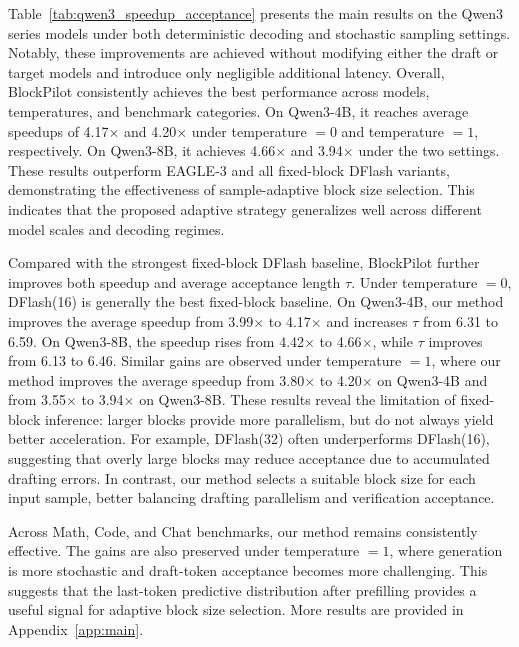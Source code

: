 \documentclass{llmxive}
\begin{document}


Table~\ref{tab:qwen3_speedup_acceptance} presents the main results on the Qwen3 series models under both deterministic decoding and stochastic sampling settings. Notably, these improvements are achieved without modifying either the draft or target models and introduce only negligible additional latency.  Overall, BlockPilot consistently achieves the best performance across models, temperatures, and benchmark categories. On Qwen3-4B, it reaches average speedups of 4.17$\times$ and 4.20$\times$ under temperature $=0$ and temperature $=1$, respectively. On Qwen3-8B, it achieves 4.66$\times$ and 3.94$\times$ under the two settings. These results outperform EAGLE-3 and all fixed-block DFlash variants, demonstrating the effectiveness of sample-adaptive block size selection. This indicates that the proposed adaptive strategy generalizes well across different model scales and decoding regimes.

Compared with the strongest fixed-block DFlash baseline, BlockPilot further improves both speedup and average acceptance length $\tau$. Under temperature $=0$, DFlash(16) is generally the best fixed-block baseline. On Qwen3-4B, our method improves the average speedup from 3.99$\times$ to 4.17$\times$ and increases $\tau$ from 6.31 to 6.59. On Qwen3-8B, the speedup rises from 4.42$\times$ to 4.66$\times$, while $\tau$ improves from 6.13 to 6.46. Similar gains are observed under temperature $=1$, where our method improves the average speedup from 3.80$\times$ to 4.20$\times$ on Qwen3-4B and from 3.55$\times$ to 3.94$\times$ on Qwen3-8B. These results reveal the limitation of fixed-block inference: larger blocks provide more parallelism, but do not always yield better acceleration. For example, DFlash(32) often underperforms DFlash(16), suggesting that overly large blocks may reduce acceptance due to accumulated drafting errors. In contrast, our method selects a suitable block size for each input sample, better balancing drafting parallelism and verification acceptance.

Across Math, Code, and Chat benchmarks, our method remains consistently effective. The gains are also preserved under temperature $=1$, where generation is more stochastic and draft-token acceptance becomes more challenging. This suggests that the last-token predictive distribution after prefilling provides a useful signal for adaptive block size selection. More results are provided in Appendix~\ref{app:main}.
\end{document}
